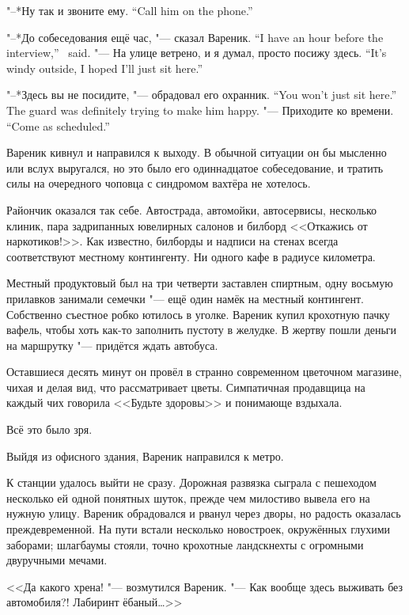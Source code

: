 {"--*Ну так и звоните ему.}
{``Call him on the phone.''}

{"--*До собеседования ещё час, "--- сказал Вареник.}
{``I have an hour before the interview,'' \Varenik\ said.}
{"--- На улице ветрено, и я думал, просто посижу здесь.}
{``It's windy outside, I hoped I'll just sit here.''}

{"--*Здесь вы не посидите, "--- обрадовал его охранник.}
{``You won't just sit here.'' The guard was definitely trying to make him happy.}
{"--- Приходите ко времени.}
{``Come as scheduled.''}

Вареник кивнул и направился к выходу.
В обычной ситуации он бы мысленно или вслух выругался, но это было его одиннадцатое собеседование, и тратить силы на очередного чоповца с синдромом вахтёра не хотелось.

Райончик оказался так себе.
Автострада, автомойки, автосервисы, несколько клиник, пара задрипанных ювелирных салонов и билборд <<Откажись от наркотиков!>>.
Как известно, билборды и надписи на стенах всегда соответствуют местному контингенту.
Ни одного кафе в радиусе километра.

Местный продуктовый был на три четверти заставлен спиртным, одну восьмую прилавков занимали семечки "--- ещё один намёк на местный контингент.
Собственно съестное робко ютилось в уголке.
Вареник купил крохотную пачку вафель, чтобы хоть как-то заполнить пустоту в желудке.
В жертву пошли деньги на маршрутку "--- придётся ждать автобуса.

Оставшиеся десять минут он провёл в странно современном цветочном магазине, чихая и делая вид, что рассматривает цветы.
Симпатичная продавщица на каждый чих говорила <<Будьте здоровы>> и понимающе вздыхала.

Всё это было зря.

\asterism

Выйдя из офисного здания, Вареник направился к метро.

К станции удалось выйти не сразу.
Дорожная развязка сыграла с пешеходом несколько ей одной понятных шуток, прежде чем милостиво вывела его на нужную улицу.
Вареник обрадовался и рванул через дворы, но радость оказалась преждевременной.
На пути встали несколько новостроек, окружённых глухими заборами;
шлагбаумы стояли, точно крохотные ландскнехты с огромными двуручными мечами.

<<Да какого хрена! "--- возмутился Вареник.
"--- Как вообще здесь выживать без автомобиля?!
Лабиринт ёбаный\ldots{}>>


